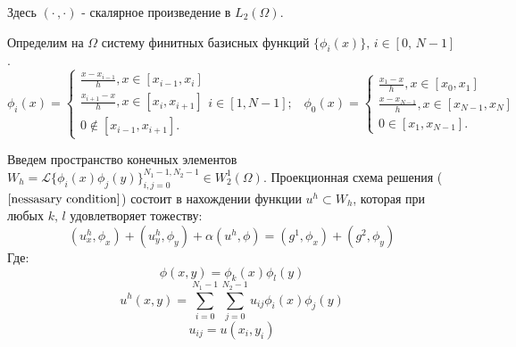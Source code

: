 \documentclass[oneside, final, 14pt]{article}
\begin{document}
Здесь $(\cdot\,,\cdot)$ - скалярное произведение в $L_2(\Omega)$.

Определим на $\Omega$ систему финитных базисных функций $\{\phi_i(x)\} ,\, i \in [0,\,N-1]$.
$$
\phi_i(x) = 
 \begin{cases}
  \frac{x-x_{i-1}}{h} , x \in [x_{i-1},x_i] \\ 
   \frac{x_{i+1} - x}{h}, x \in [x_{i},x_{i+1}]   \\
   0 \notin [x_{i-1},x_{i+1}].
 \end{cases} i \in [1, N-1];\;\;\;
\phi_0(x) = 
 \begin{cases}
  \frac{x_1-x}{h} , x \in [x_{0},x_1] \\ 
   \frac{x - x_{N-1}}{h}, x \in [x_{N-1},x_{N}]   \\
   0 \in [x_{1},x_{N-1}].
 \end{cases}
$$

Введем пространство конечных элементов $W_h = \mathscr{L}\{\phi_i(x)\phi_j(y)\}_{i,j=0}^{N_1 - 1,N_2-1} \in W_{2}^{1}(\Omega)$. 
Проекционная схема решения ($\ref{nessasary condition}$) состоит в нахождении функции $u^h \subset W_h$, которая при любых $k,\,l$ удовлетворяет тожеству:
\begin{equation}\label{mult diff scheme}
(u_x^h,\phi_x)+(u_y^h,\phi_y) + \alpha(u^h,\phi) = (g^1,\phi_x) + (g^2,\phi_y)
\end{equation}
Где:
$$\phi(x,y) = \phi_k(x)\phi_l(y)$$
$$u^h(x,y) = \sum \limits_{i=0}^{N_1-1} \sum \limits_{j=0}^{N_2-1} u_{ij}\phi_i(x)\phi_j(y)$$
$$u_{ij} = u(x_i,y_i)$$
\end{document}
